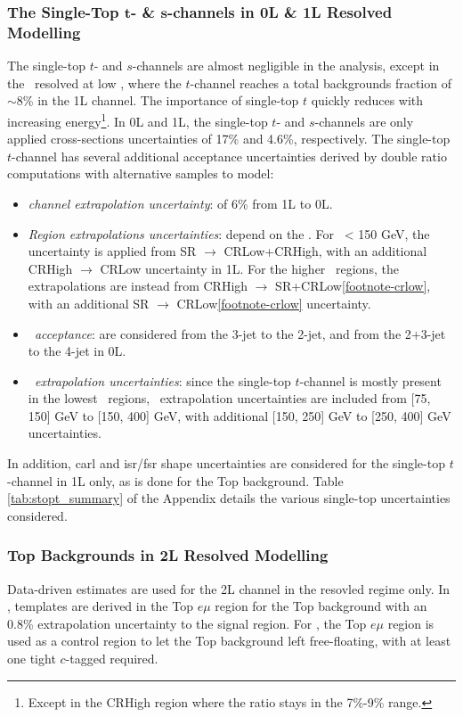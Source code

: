 \subsubsection{The Single-Top $\boldsymbol{t}$- \& $\boldsymbol{s}$-channels in 0L \& 1L Resolved Modelling}
The single-top $t$- and $s$-channels are almost negligible in the analysis, except in the \vhb\ resolved at low \ptv, where the $t$-channel reaches a total backgrounds fraction of $\sim$8\% in the 1L channel. The importance of single-top $t$ quickly reduces with increasing energy\footnote{Except in the CRHigh region where the ratio stays in the 7\%-9\% range.}. In 0L and 1L, the single-top $t$- and $s$-channels are only applied cross-sections uncertainties of 17\% and 4.6\%, respectively. The single-top $t$-channel has several additional acceptance uncertainties derived by double ratio computations with alternative samples to model: 
\begin{itemize}[leftmargin=*]
    \item \textit{channel extrapolation uncertainty}: of 6\% from 1L to 0L.
    \item \textit{Region extrapolations uncertainties}: depend on the \ptv. For \ptv\ < 150 GeV, the uncertainty is applied from SR $\rightarrow$ CRLow+CRHigh, with an additional CRHigh $\rightarrow$ CRLow uncertainty in 1L. For the higher \ptv\ regions, the extrapolations are instead from CRHigh $\rightarrow$ SR+CRLow\cref{footnote-crlow}, with an additional SR $\rightarrow$ CRLow\cref{footnote-crlow} uncertainty.
    \item \textit{\nj\ acceptance}: are considered from the 3-jet to the 2-jet, and from the 2+3-jet to the 4-jet in 0L.
    \item \textit{\ptv\ extrapolation uncertainties}: since the single-top $t$-channel is mostly present in the lowest \ptv\ regions, \ptv\ extrapolation uncertainties are included from [75, 150] GeV to [150, 400] GeV, with additional [150, 250] GeV to [250, 400] GeV uncertainties.
\end{itemize}
In addition, \gls{carl} and \gls{isr}/\gls{fsr} shape uncertainties are considered for the single-top $t$-channel in 1L only, as is done for the Top background. Table \ref{tab:stopt_summary} of the Appendix details the various single-top uncertainties considered.

\subsubsection{Top Backgrounds in 2L Resolved Modelling} 
Data-driven estimates are used for the 2L channel in the resovled regime only. In \vhb, templates are derived in the Top $e\mu$ region for the Top background with an 0.8\% extrapolation uncertainty to the signal region. For \vhc, the Top $e\mu$ region is used as a control region to let the Top background left free-floating, with at least one tight $c$-tagged required.

